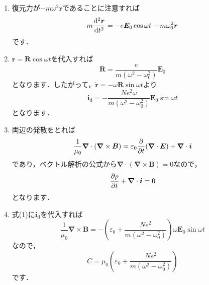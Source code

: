 \documentclass[a4paper,pdflatex,ja=standard]{bxjsarticle}
\begin{document}
\begin{enumerate}
  
  \item 

  復元力が$-m\omega^2\bm{r}$であることに注意すれば
  \begin{equation}
    m\dv[2]{\bm{r}}{t}
    =
    -
    e\bm{E}_0\cos\omega t
    -
    m\omega_0^2\bm{r}
  \end{equation}
  です．


  \item 

  $\bm{r}=\bm{R}\cos\omega t$を代入すれば
  \begin{equation}
    \bm{R}
    =
    \frac{e}{m(\omega^2-\omega_0^2)}\bm{E}_0
  \end{equation}
  となります．したがって，$\dot{\bm{r}}=-\omega\bm{R}\sin\omega t$より
  \begin{equation}
    \bm{i}_{\mathrm{d}}
    =
    -
    \frac{Ne^2\omega}{m(\omega^2-\omega^2_0)}\bm{E}_0\sin\omega t
  \end{equation}
  となります．


  \item 

  両辺の発散をとれば
  \begin{equation}
    \frac{1}{\mu_0}
    \bm{\nabla}\cdot(\bm{\nabla}\times\bm{B})
    =
    \varepsilon_0\pdv{}{t}\hspace{0pt}
    (\bm{\nabla}\cdot\bm{E})
    +
    \bm{\nabla}\cdot\bm{i}
  \end{equation}
  であり，ベクトル解析の公式から$\bm{\nabla}\cdot(\bm{\nabla}\times\bm{B})=0$なので，
  \begin{equation}
    \pdv{\rho}{t}
    +
    \bm{\nabla}\cdot\bm{i}
    =
    0
  \end{equation}
  となります．


  \item 

  式(1)に$\bm{i}_{\mathrm{d}}$を代入すれば
  \begin{equation}
    \frac{1}{\mu_0}\bm{\nabla}\times\bm{B}
    =
    -
    \left(  
      \varepsilon_0
      +
      \frac{Ne^2}{m(\omega^2-\omega^2_0)}
    \right)
    \omega\bm{E}_0\sin\omega t   
  \end{equation}
  なので，
  \begin{equation}
    C
    =
    \mu_0
    \left(  
      \varepsilon_0
      +
      \frac{Ne^2}{m(\omega^2-\omega^2_0)}
    \right)
  \end{equation}
  です．


\end{enumerate}
\end{document}
